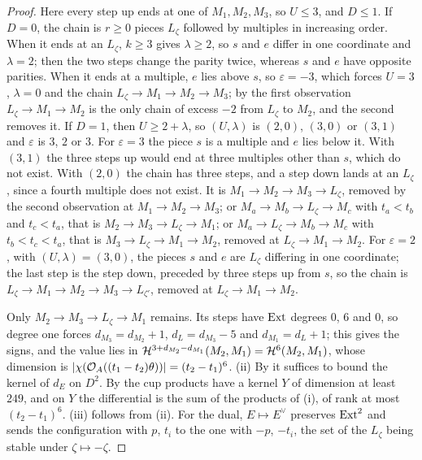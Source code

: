 \begin{proof}
Here every step up ends at one of $M_{1},M_{2},M_{3}$, so $U\le3$, and
$D\le1$. If $D=0$, the chain is $r\ge0$ pieces $L_{\zeta}$ followed by
multiples in increasing order. When it ends at an $L_{\zeta}$, $k\ge3$ gives
$\lambda\ge2$, so $s$ and $e$ differ in one coordinate and $\lambda=2$; then
the two steps change the parity twice, whereas $s$ and $e$ have opposite
parities. When it ends at a multiple, $e$ lies above $s$, so $\varepsilon=-3$,
which forces $U=3$, $\lambda=0$ and the chain $L_{\zeta}\to M_{1}\to
M_{2}\to M_{3}$; by the first observation $L_{\zeta}\to M_{1}\to M_{2}$ is the
only chain of excess $-2$ from $L_{\zeta}$ to $M_{2}$, and the second removes
it. If $D=1$, then $U\ge2+\lambda$, so $(U,\lambda)$ is $(2,0)$, $(3,0)$ or
$(3,1)$ and $\varepsilon$ is $3$, $2$ or $3$. For $\varepsilon=3$ the piece
$s$ is a multiple and $e$ lies below it. With $(3,1)$ the three steps up
would end at three multiples other than $s$, which do not exist. With $(2,0)$
the chain has three steps, and a step down lands at an $L_{\zeta}$, since a
fourth multiple does not exist. It is $M_{1}\to M_{2}\to M_{3}\to L_{\zeta}$,
removed by the second observation at $M_{1}\to M_{2}\to M_{3}$; or
$M_{a}\to M_{b}\to L_{\zeta}\to M_{c}$ with $t_{a}<t_{b}$ and $t_{c}<t_{a}$,
that is $M_{2}\to M_{3}\to L_{\zeta}\to M_{1}$; or
$M_{a}\to L_{\zeta}\to M_{b}\to M_{c}$ with $t_{b}<t_{c}<t_{a}$, that is
$M_{3}\to L_{\zeta}\to M_{1}\to M_{2}$, removed at $L_{\zeta}\to M_{1}\to
M_{2}$. For $\varepsilon=2$, with $(U,\lambda)=(3,0)$, the pieces $s$ and $e$
are $L_{\zeta}$ differing in one coordinate; the last step is the step down,
preceded by three steps up from $s$, so the chain is $L_{\zeta}\to M_{1}\to
M_{2}\to M_{3}\to L_{\zeta'}$, removed at $L_{\zeta}\to M_{1}\to M_{2}$.

Only $M_{2}\to M_{3}\to L_{\zeta}\to M_{1}$ remains. Its steps have $\operatorname{Ext}$
degrees $0$, $6$ and $0$, so degree one forces $d_{M_{3}}=d_{M_{2}}+1$,
$d_{L}=d_{M_{3}}-5$ and $d_{M_{1}}=d_{L}+1$; this gives the signs, and the
value lies in
$\mathcal{H}^{3+d_{M_{2}}-d_{M_{1}}}(M_{2},M_{1})=\mathcal{H}^{6}(M_{2},M_{1})$, whose
dimension is $|\chi(\mathcal{O}_{A}((t_{1}-t_{2})\theta))|=(t_{2}-t_{1})^{6}$.
(ii) By  it suffices to bound the kernel of $d_{E}$
on $D^{2}$. By  the cup products have a kernel $Y$ of
dimension at least $249$, and on $Y$ the differential is the sum of the
products of (i), of rank at most $(t_{2}-t_{1})^{6}$. (iii) follows from
(ii). For the dual, $E\mapsto E^{\vee}$ preserves $\operatorname{Ext}^{2}$ and sends the
configuration with $p$, $t_{i}$ to the one with $-p$, $-t_{i}$, the set of
the $L_{\zeta}$ being stable under $\zeta\mapsto-\zeta$.
\end{proof}

